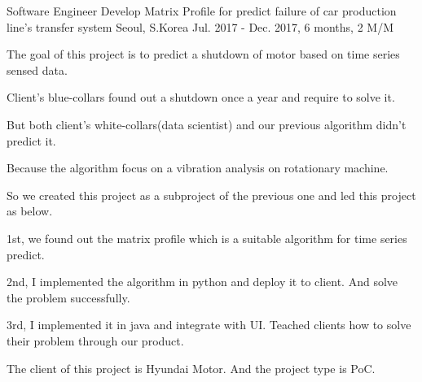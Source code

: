 \begin{cventries}
  \cventry
    {Software Engineer} %
    {Develop Matrix Profile for predict failure of car production line's transfer system} %
    {Seoul, S.Korea} %
    {Jul. 2017 - Dec. 2017, 6 months, 2 M/M} %
    {
      \begin{cvitems} %
        \item {The goal of this project is to predict a shutdown of motor based on time series sensed data.}
        \item {Client's blue-collars found out a shutdown once a year and require to solve it.}
        \item {But both client's white-collars(data scientist) and our previous algorithm didn't predict it.}
        \item {Because the algorithm focus on a vibration analysis on rotationary machine.}
        \item {So we created this project as a subproject of the previous one and led this project as below.}
        \item {1st, we found out the matrix profile which is a suitable algorithm for time series predict.}
        \item {2nd, I implemented the algorithm in python and deploy it to client. And solve the problem successfully.}
        \item {3rd, I implemented it in java and integrate with UI. Teached clients how to solve their problem through our product.}
        \item {The client of this project is Hyundai Motor. And the project type is PoC.}
      \end{cvitems}
    }


\end{cventries}
